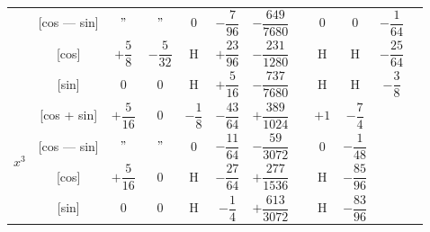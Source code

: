 \documentclass[11pt,a4paper]{book}
\begin{document}
{{\begin{center}
\begin{tabular}{|c|c|c|c|c|c|c|c|c|c|c|c|}
& [cos --- sin] & $"$ & $"$ & $0$ & $-\dfrac{7}{96}$ & $-\dfrac{649}{7680}$ & & $0$ & $0$ & $-\dfrac{1}{64}$ \\
& [cos] & $+\dfrac{5}{8}$ & $-\dfrac{5}{32}$ & H & $+\dfrac{23}{96}$ & $-\dfrac{231}{1280}$ & & H & H & $-\dfrac{25}{64}$ \\
& [sin] & $0$ & $0$ & H & $+\dfrac{5}{16}$ & $-\dfrac{737}{7680}$ & & H & H & $-\dfrac{3}{8}$ \\
\hline
\multirow{4}{*}{$x^3$} & [cos + sin] & $+\dfrac{5}{16}$ & $0$ & $-\dfrac{1}{8}$ & $-\dfrac{43}{64}$ & $+\dfrac{389}{1024}$ & & $+1$ & $-\dfrac{7}{4}$ \\
& [cos --- sin] & $"$ & $"$ & $0$ & $-\dfrac{11}{64}$ & $-\dfrac{59}{3072}$ & & $0$ & $-\dfrac{1}{48}$ \\
& [cos] & $+\dfrac{5}{16}$ & $0$ & H & $-\dfrac{27}{64}$ & $+\dfrac{277}{1536}$ & & H & $-\dfrac{85}{96}$ \\
& [sin] & $0$ & $0$ & H & $-\dfrac{1}{4}$ & $+\dfrac{613}{3072}$ & & H & $-\dfrac{83}{96}$ \\
\hline
\end{tabular}
\end{center}

\vspace{1em}


}}
\end{document}
